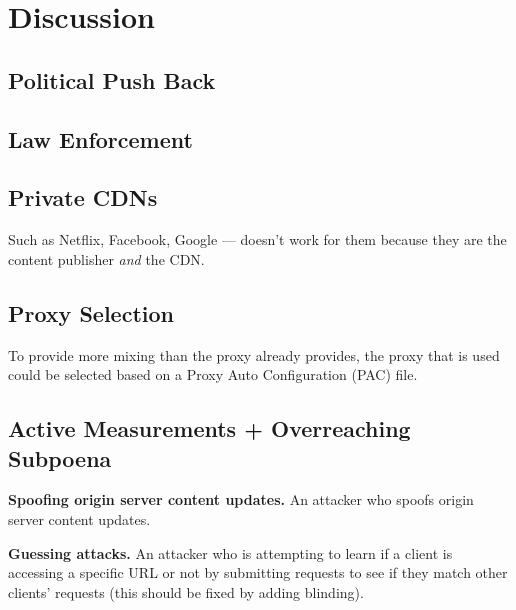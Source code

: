 \section{Discussion}
\label{sec:discussion}

\subsection{Political Push Back}

\subsection{Law Enforcement}

\subsection{Private CDNs}
Such as Netflix, Facebook, Google --- \system{} doesn't work for them because they are the content publisher {\it and} the CDN.

\subsection{Proxy Selection}
To provide more mixing than the proxy already provides, 
the proxy that is used could be selected based 
on a Proxy Auto Configuration (PAC) file.

\subsection{Active Measurements + Overreaching Subpoena}

{\bf Spoofing origin server content updates.}
An attacker who spoofs origin server content updates.

{\bf Guessing attacks.}
An attacker who is attempting to learn if a client is accessing a specific URL or not by submitting requests to see if they match other clients' requests (this should be fixed by adding blinding).

